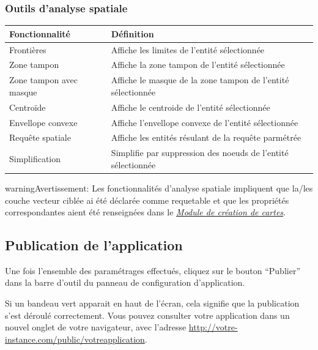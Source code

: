 \documentclass[letterpaper,10pt,french]{sphinxmanual}
\begin{document}
\subsubsection{Outils d'analyse spatiale}
\label{apps/appconfig:outils-d-analyse-spatiale}
\begin{tabulary}{\linewidth}{|L|L|}
\hline

\textbf{Fonctionnalité}
 & 
\textbf{Définition}
\\
\hline
Frontières
 & 
Affiche les limites de l'entité sélectionnée
\\
\hline
Zone tampon
 & 
Affiche la zone tampon de l'entité sélectionnée
\\
\hline
Zone tampon avec masque
 & 
Affiche le masque de la zone tampon de l'entité sélectionnée
\\
\hline
Centroïde
 & 
Affiche le centroide de l'entité sélectionnée
\\
\hline
Envellope convexe
 & 
Affiche l'envellope convexe  de l'entité sélectionnée
\\
\hline
Requête spatiale
 & 
Affiche les entités résulant de la requête parmétrée
\\
\hline
Simplification
 & 
Simplifie par suppression des noeuds de l'entité sélectionnée
\\
\hline\end{tabulary}


\begin{notice}{warning}{Avertissement:}
Les fonctionnalités d'analyse spatiale impliquent que la/les couche vecteur ciblée ai été déclarée comme requetable et que les propriétés correspondantes aient été renseignées dans le {\hyperref[maps/index::doc]{\emph{\emph{Module de création de cartes}}}}.
\end{notice}


\subsection{Publication de l'application}
\label{apps/appconfig:publication-de-l-application}
Une fois l'ensemble des paramétrages effectués, cliquez sur le bouton ``Publier'' dans la barre d'outil du panneau de configuration d'application.

Si un bandeau vert apparait en haut de l'écran, cela signifie que la publication s'est déroulé correctement. Vous pouvez consulter votre application dans un nouvel onglet de votre navigateur, avec l'adresse \href{http://votre-instance.com/public/votreapplication}{http://votre-instance.com/public/votreapplication}.
\end{document}
